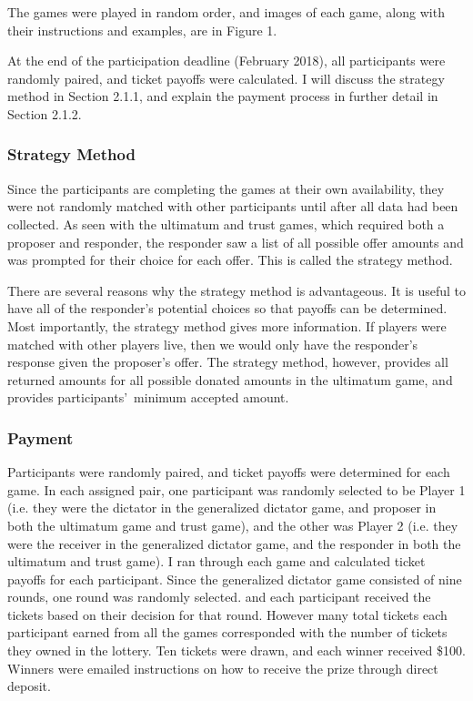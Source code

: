 \documentclass[12pt]{article}
\begin{document}
The games were played in random order, and images of each game, along with their instructions and examples, are in {\color{green}Figure 1}.

 At the end of the participation deadline (February 2018), all participants were randomly paired, and ticket payoffs were calculated. I will discuss the strategy method in Section 2.1.1, and explain the payment process in further detail in Section 2.1.2. 

\subsubsection{Strategy Method}

Since the participants are completing the games at their own availability, they were not randomly matched with other participants until after all data had been collected. As seen with the ultimatum and trust games, which required both a proposer and responder, the responder saw a list of all possible offer amounts and was prompted for their choice for each offer. This is called the strategy method.

There are several reasons why the strategy method is advantageous. It is useful to have all of the responder\rq s potential choices so that payoffs can be determined. Most importantly, the strategy method gives more information. If players were matched with other players live, then we would only have the responder\rq s response given the proposer\rq s offer. The strategy method, however, provides all returned amounts for all possible donated amounts in the ultimatum game, and provides participants\rq \ minimum accepted amount. 

\subsubsection{Payment}

Participants were randomly paired, and ticket payoffs were determined for each game. In each assigned pair, one participant was randomly selected to be Player 1 (i.e. they were the dictator in the generalized dictator game, and proposer in both the ultimatum game and trust game), and the other was Player 2 (i.e. they were the receiver in the generalized dictator game, and the responder in both the ultimatum and trust game). I ran through each game and calculated ticket payoffs for each participant. Since the generalized dictator game consisted of nine rounds, one round was randomly selected. and each participant received the tickets based on their decision for that round. However many total tickets each participant earned from all the games corresponded with the number of tickets they owned in the lottery. Ten tickets were drawn, and each winner received \$100. Winners were emailed instructions on how to receive the prize through direct deposit.
\end{document}
